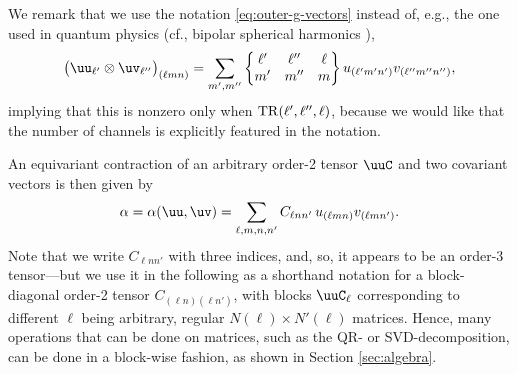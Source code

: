 We remark that we use the notation \eqref{eq:outer-g-vectors} instead of, e.g.,
the one used in quantum physics
(cf., bipolar spherical harmonics \citep{varshalovich_quantum_1988}), \begin{equation}%
    \big(\uu_{\ell'} \otimes \uv_{\ell''}\big)_{(\ell mn)}
    =
    \sum_{m',m''}
    \begin{Bmatrix}
        \ell' & \ell'' & \ell \\
        m' & m'' & m
    \end{Bmatrix}
    u_{(\ell'm'n')} v_{(\ell''m''n'')}
    ,
\end{equation}
implying that this is nonzero only when ${\rm TR}(\ell',\ell'',\ell)$, because we would like that the number of channels is explicitly featured in the notation.

An equivariant contraction of an arbitrary order-2 tensor $\uuC$ and two covariant vectors is then given by
\begin{equation}\label{eq:order-2-tensor-contraction}
    \alpha
    =
    \alpha(\uu,\uv)
    =
    \sum_{\ell,m,n,n'} C_{\ell nn'} \, u_{(\ell mn)} v_{(\ell mn')}.
\end{equation}
Note that we write $C_{\ell nn'}$ with three indices, and, so, it appears to be an order-3 tensor---but we use it in the following as a shorthand notation for a block-diagonal order-2 tensor $C_{(\ell n)(\ell n')}$, with blocks $\uuC_\ell$ corresponding to different $\ell$ being arbitrary, regular $N(\ell) \times N'(\ell)$ matrices.
Hence, many operations that can be done on matrices, such as the QR- or SVD-decomposition, can be done in a block-wise fashion, as shown in Section \ref{sec:algebra}.

